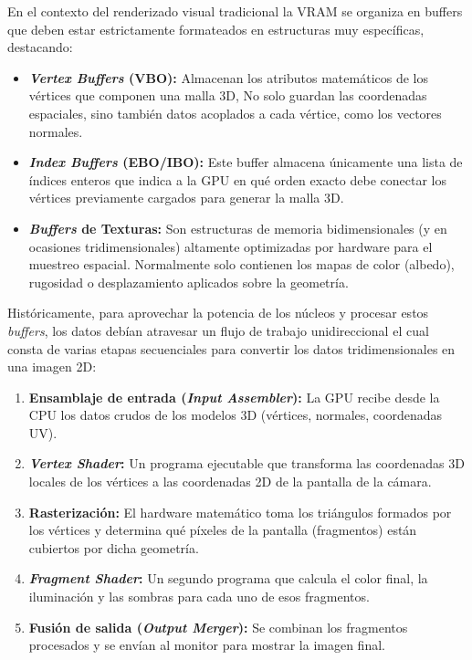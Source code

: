         En el contexto del renderizado visual tradicional la VRAM se organiza en buffers que deben estar estrictamente formateados en estructuras muy específicas, destacando\cite{escudero2023}\cite{referencia_mpg}:
        \begin{itemize}
            \item \textbf{\textit{Vertex Buffers} (VBO):} Almacenan los atributos matemáticos de los vértices que componen una malla 3D, No solo guardan las coordenadas espaciales, sino también datos acoplados a cada vértice, como los vectores normales.
            \item \textbf{\textit{Index Buffers} (EBO/IBO):} Este buffer almacena  únicamente una lista de índices enteros que indica a la GPU en qué orden exacto debe conectar los vértices previamente cargados para generar la malla 3D.
            \item \textbf{\textit{Buffers} de Texturas:} Son estructuras de memoria bidimensionales (y en ocasiones tridimensionales) altamente optimizadas por hardware para el muestreo espacial. Normalmente solo contienen los mapas de color (albedo), rugosidad o desplazamiento aplicados sobre la geometría.
        \end{itemize}

        Históricamente, para aprovechar la potencia de los núcleos y procesar estos \textit{buffers}, los datos debían atravesar un flujo de trabajo unidireccional el cual consta de varias etapas secuenciales para convertir los datos tridimensionales en una imagen 2D:
        
        \begin{enumerate}
            \item \textbf{Ensamblaje de entrada (\textit{Input Assembler}):} La GPU recibe desde la CPU los datos crudos de los modelos 3D (vértices, normales, coordenadas UV).
            \item \textbf{\textit{Vertex Shader}:} Un programa ejecutable que transforma las coordenadas 3D locales de los vértices a las coordenadas 2D de la pantalla de la cámara.
            \item \textbf{Rasterización:} El hardware matemático toma los triángulos formados por los vértices y  determina qué píxeles de la pantalla (fragmentos) están cubiertos por dicha geometría.
            \item \textbf{\textit{Fragment Shader}:} Un segundo programa que calcula el color final, la iluminación y las sombras para cada uno de esos fragmentos.
            \item \textbf{Fusión de salida (\textit{Output Merger}):} Se combinan los fragmentos procesados y se envían al monitor para mostrar la imagen final.
        \end{enumerate}


